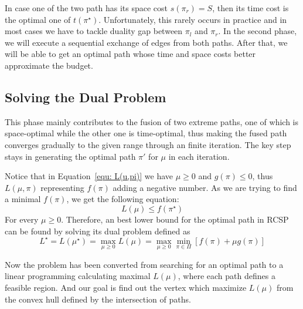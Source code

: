 \documentclass{sig-alternate-05-2015}
\begin{document}
In case one of the two path has its space cost $ s(\pi_r) = S $, then its time cost is the optimal one of $ t(\pi^\star) $.
Unfortunately, this rarely occurs in practice and in most cases we have to tackle duality gap between $ \pi_l $ and $ \pi_r $.
In the second phase, we will execute a sequential exchange of edges from both paths.
After that, we will be able to get an optimal path whose time and space costs better approximate the budget.

\subsection{Solving the Dual Problem}
This phase mainly contributes to the fusion of two extreme paths, one of which is space-optimal while the other one is time-optimal, thus making the fused path converges gradually to the given range through an finite iteration.
The key step stays in generating the optimal path $ \pi' $ for $ \mu $ in each iteration.

Notice that in Equation~\eqref{equ: L(u,pi)} we have $ \mu \geqslant 0 $ and $ g(\pi) \leqslant 0 $, thus $ L(\mu,\pi) $ representing $ f(\pi) $ adding a negative number.
As we are trying to find a minimal $ f(\pi) $, we get the following equation:
\begin{equation}
L(\mu) \leqslant f(\pi^\star) \label{equ: maximum}
\end{equation}
\noindent For every $ \mu \geqslant 0 $.
Therefore, an best lower bound for the optimal path in RCSP can be found by solving its dual problem defined as 
\begin{equation}
L^\star = L(\mu^\star) = \max_{\mu \geqslant 0} L(\mu) =\max_{\mu \geqslant 0} \min_{\pi \in \Pi} \left[ f(\pi) + \mu g(\pi) \right]
\end{equation}

Now the problem has been converted from searching for an optimal path to a linear programming calculating maximal $ L(\mu) $, where each path defines a feasible region.
And our goal is find out the vertex which maximize $ L(\mu) $ from the convex hull defined by the intersection of paths.
\end{document}
